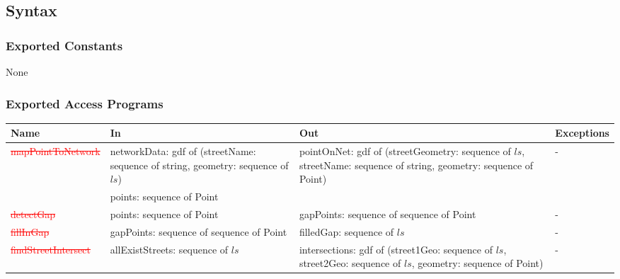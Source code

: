 \documentclass[12pt, titlepage]{article}
\begin{document}
\subsection{Syntax}

\subsubsection{Exported Constants}
None

\subsubsection{Exported Access Programs}

\begin{center}
\begin{tabular}{| l | >{\raggedright}p{4cm} | >{\raggedright}p{4cm} | l |}%
\hline
\textbf{Name} & \textbf{In} & \textbf{Out} & \textbf{Exceptions} \\
\hline
\textcolor{red}{\sout{mapPointToNetwork}} & networkData: gdf of (streetName: sequence of string, geometry: sequence of $ls$) & pointOnNet: gdf of (streetGeometry: sequence of $ls$, streetName: sequence of string, geometry: sequence of Point) & - \\
 & points: sequence of Point &&\\
\hline
\textcolor{red}{\sout{detectGap}} & points: sequence of Point & gapPoints: sequence of sequence of Point & - \\
\hline
\textcolor{red}{\sout{fillInGap}} & gapPoints: sequence of sequence of Point & filledGap: sequence of $ls$ & - \\
\hline
\textcolor{red}{\sout{findStreetIntersect}} & allExistStreets: sequence of $ls$ & intersections: gdf of (street1Geo: sequence of $ls$, street2Geo: sequence of $ls$, geometry: sequence of Point) & - \\
\hline
\end{tabular}
\end{center}
\end{document}
